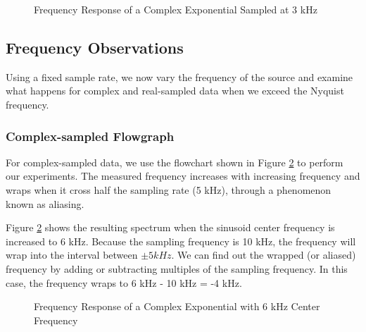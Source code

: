 \documentclass{article}
\begin{document}
\begin{figure}[H]
	\centerline{}
	\caption{Frequency Response of a Complex Exponential Sampled at 3 kHz}
	\label{fig::complex_sampling_freq_domain_3k_samp_rate}
\end{figure}

\subsection{Frequency Observations}

Using a fixed sample rate, we now vary the frequency of the source and examine what happens for complex and real-sampled data when we exceed the Nyquist frequency.

\subsubsection{Complex-sampled Flowgraph}

For complex-sampled data, we use the flowchart shown in Figure \ref{fig::freq_observations_complex_6k_center_freq} to perform our experiments. The measured frequency increases with increasing frequency and wraps when it cross half the sampling rate (5 kHz), through a phenomenon known as aliasing.

Figure \ref{fig::freq_observations_complex_6k_center_freq} shows the resulting spectrum when the sinusoid center frequency is increased to 6 kHz. Because the sampling frequency is 10 kHz, the frequency will wrap into the interval between $\pm 5 kHz$. We can find out the wrapped (or aliased) frequency by adding or subtracting multiples of the sampling frequency. In this case, the frequency wraps to 6 kHz - 10 kHz = -4 kHz.

\begin{figure}[H]
	\centerline{}
	\caption{Frequency Response of a Complex Exponential with 6 kHz Center Frequency}
	\label{fig::freq_observations_complex_6k_center_freq}
\end{figure}
\end{document}
